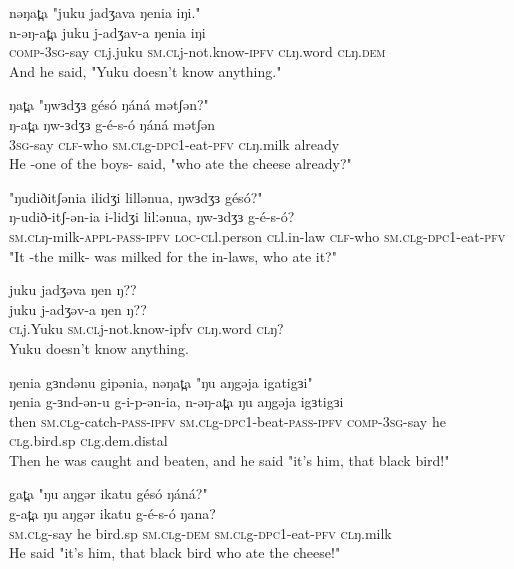 \ex  nəŋat̪a "juku jadʒava ŋenia iŋi." 	  \\ 
	\gll  n-əŋ-at̪a juku j-adʒav-a ŋenia iŋi\\	
		  \textsc{comp-3sg}-say \textsc{cl}j.juku \textsc{sm.cl}j-not.know-\textsc{ipfv} \textsc{cl}ŋ.word \textsc{cl}ŋ.\textsc{dem}   \\
		 \glt And he said, "Yuku doesn't know anything." 
		  
\ex  ŋat̪a "ŋwɜdʒɜ gésó ŋáná mətʃən?" 	  \\ 
	\gll  ŋ-at̪a ŋw-ɜdʒɜ g-é-s-ó ŋáná mətʃən\\	
		  \textsc{3sg}-say \textsc{clf}-who \textsc{sm.cl}g-\textsc{dpc1}-eat-\textsc{pfv} \textsc{cl}ŋ.milk already\\
		 \glt He -one of the boys- said, "who ate the cheese already?"  
		  
\ex  "ŋudiðitʃənia ilidʒi lillənua, ŋwɜdʒɜ gésó?"	  \\ 
	\gll  ŋ-udið-itʃ-ən-ia i-lidʒi lilːənua, ŋw-ɜdʒɜ g-é-s-ó?\\	
		  \textsc{sm.cl}ŋ-milk-\textsc{appl-pass-ipfv} \textsc{loc-cl}l.person \textsc{cl}l.in-law \textsc{clf}-who \textsc{sm.cl}g-\textsc{dpc1}-eat-\textsc{pfv}   \\
		 \glt "It -the milk- was milked for the in-laws, who ate it?"  
		 
\ex  juku jadʒəva ŋen ŋ??  	  \\ 
	\gll  juku j-adʒəv-a ŋen ŋ??\\	
		  \textsc{cl}j.Yuku \textsc{sm.cl}j-not.know-ipfv \textsc{cl}ŋ.word \textsc{cl}ŋ?   \\
		 \glt Yuku doesn't know anything.  
		 	  
\ex  ŋenia gɜndənu gipənia, nəŋat̪a "ŋu aŋgəja igatigɜi"	  \\ 
	\gll  ŋenia g-ɜnd-ən-u g-i-p-ən-ia, n-əŋ-at̪a ŋu aŋgəja igɜtigɜi\\	
		  then \textsc{sm.cl}g-catch-\textsc{pass-ipfv} \textsc{sm.cl}g-\textsc{dpc1}-beat-\textsc{pass-ipfv} \textsc{comp-3sg}-say he \textsc{cl}g.bird.sp \textsc{cl}g.{dem.distal}   \\
		 \glt Then he was caught and beaten, and he said "it's him, that black bird!" 
		 	  
\ex  gat̪a "ŋu aŋgər ikatu gésó ŋáná?"	  \\ 
	\gll  g-at̪a ŋu aŋgər ikatu g-é-s-ó ŋana?\\	
		  \textsc{sm.cl}g-say he bird.sp \textsc{sm.cl}g-\textsc{dem} \textsc{sm.cl}g-\textsc{dpc1}-eat-\textsc{pfv} \textsc{cl}ŋ.milk \\
		 \glt He said "it's him, that black bird who ate the cheese!"
		 	  
